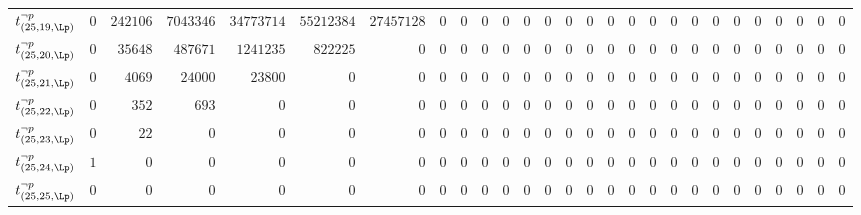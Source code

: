 \begin{tabular}{r|rrrrrrrrrrrrrrrrrrrrrrrrrr}
  $t^{\neg p}_{(25,19,\Lp)}$ & $0$ & $242106$ & $7043346$ & $34773714$ & $55212384$ & $27457128$ & $0$ & $0$ & $0$ & $0$ & $0$ & $0$ & $0$ & $0$ & $0$ & $0$ & $0$ & $0$ & $0$ & $0$ & $0$ & $0$ & $0$ & $0$ & $0$ & $0$ \\
  $t^{\neg p}_{(25,20,\Lp)}$ & $0$ & $35648$ & $487671$ & $1241235$ & $822225$ & $0$ & $0$ & $0$ & $0$ & $0$ & $0$ & $0$ & $0$ & $0$ & $0$ & $0$ & $0$ & $0$ & $0$ & $0$ & $0$ & $0$ & $0$ & $0$ & $0$ & $0$ \\
  $t^{\neg p}_{(25,21,\Lp)}$ & $0$ & $4069$ & $24000$ & $23800$ & $0$ & $0$ & $0$ & $0$ & $0$ & $0$ & $0$ & $0$ & $0$ & $0$ & $0$ & $0$ & $0$ & $0$ & $0$ & $0$ & $0$ & $0$ & $0$ & $0$ & $0$ & $0$ \\
  $t^{\neg p}_{(25,22,\Lp)}$ & $0$ & $352$ & $693$ & $0$ & $0$ & $0$ & $0$ & $0$ & $0$ & $0$ & $0$ & $0$ & $0$ & $0$ & $0$ & $0$ & $0$ & $0$ & $0$ & $0$ & $0$ & $0$ & $0$ & $0$ & $0$ & $0$ \\
  $t^{\neg p}_{(25,23,\Lp)}$ & $0$ & $22$ & $0$ & $0$ & $0$ & $0$ & $0$ & $0$ & $0$ & $0$ & $0$ & $0$ & $0$ & $0$ & $0$ & $0$ & $0$ & $0$ & $0$ & $0$ & $0$ & $0$ & $0$ & $0$ & $0$ & $0$ \\
  $t^{\neg p}_{(25,24,\Lp)}$ & $1$ & $0$ & $0$ & $0$ & $0$ & $0$ & $0$ & $0$ & $0$ & $0$ & $0$ & $0$ & $0$ & $0$ & $0$ & $0$ & $0$ & $0$ & $0$ & $0$ & $0$ & $0$ & $0$ & $0$ & $0$ & $0$ \\
  $t^{\neg p}_{(25,25,\Lp)}$ & $0$ & $0$ & $0$ & $0$ & $0$ & $0$ & $0$ & $0$ & $0$ & $0$ & $0$ & $0$ & $0$ & $0$ & $0$ & $0$ & $0$ & $0$ & $0$ & $0$ & $0$ & $0$ & $0$ & $0$ & $0$ & $0$ \\
\end{tabular}

